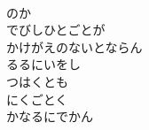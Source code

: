 \documentclass[10pt,b5j]{tarticle} %
\begin{document}
\begin{enumerate}
\begin{minipage}[c]{\blocksize}
    \end{minipage}
    \begin{minipage}[c]{\blocksize}
        
        \vspace{\linespace}
        \item~\\
        のか\\
        でびしひとごとが\\
        かけがえのないとならん\\
        るるにいをし\\
        つはくとも\\
        にくごとく\\ %
        かなるにでかん

    
    \end{minipage}
\end{enumerate} %
\end{document}
